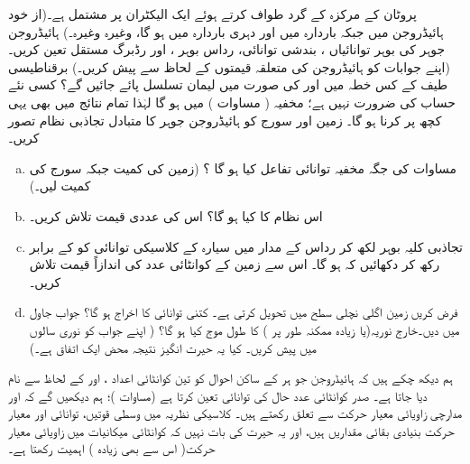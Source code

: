   پروٹان کے مرکزہ کے گرد طواف کرتے ہوئے ایک الیکٹران پر مشتمل ہے۔(از خود ہائیڈروجن میں  جبکہ باردارہ میں  اور دہری باردارہ  میں  ہو گا، وغیرہ وغیرہ۔) ہائیڈروجن جوہر کی بوہر توانائیاں ، بندشی توانائی، رداس بوہر ، اور رڈبرگ مستقل 
 تعین کریں۔ (اپنے جوابات کو ہائیڈروجن کی متعلقہ قیمتوں کے لحاظ سے پیش کریں۔) برقناطیسی طیف کے کس خطہ میں  اور  کی صورت میں لیمان تسلسل پائے جائیں گے؟  کسی نئے حساب کی ضرورت نہیں ہے؛ مخفیہ ( مساوات ) میں  ہو گا لہٰذا تمام نتائج میں بھی یہی کچھ پر کرنا ہو گا۔
زمین اور سورج کو ہائیڈروجن جوہر کا متبادل تجاذبی نظام تصور کریں۔
\begin{enumerate}[a.]
\item
 مساوات  کی جگہ مخفیہ توانائی تفاعل کیا ہو گا ؟ (زمین کی کمیت  جبکہ سورج کی کمیت  لیں۔)
\item
اس نظام کا   کیا ہو گا؟ اس کی عددی قیمت تلاش کریں۔
\item
تجاذبی کلیہ بوہر لکھ کر رداس  کے مدار میں سیارہ کے کلاسیکی توانائی کو  کے برابر رکھ کر دکھائیں کہ  ہو گا۔ اس سے زمین کے کوانٹائی عدد کی اندازاً قیمت تلاش کریں۔ 
\item
فرض کریں زمین اگلی نچلی سطح  میں تحویل کرتی ہے۔ کتنی توانائی کا اخراج ہو گا؟ جواب جاول میں دیں۔خارج نوریہ(یا زیادہ ممکنہ طور پر ) کا طول موج کیا ہو گا؟ ( اپنے جواب کو نوری سالوں میں پیش کریں۔ کیا یہ حیرت انگیز نتیجہ محض ایک اتفاق ہے۔)
\end{enumerate}

ہم دیکھ چکے ہیں کہ ہائیڈروجن جو ہر کے ساکن احوال کو تین کوانٹائی اعداد ،  اور  کے لحاظ سے نام دیا جاتا ہے۔ صدر کوانٹائی عدد  حال کی توانائی تعین کرتا ہے (مساوات )؛ ہم دیکھیں گے کہ  اور  مدارچی زاویائی معیار حرکت سے تعلق رکھتے ہیں۔ کلاسیکی نظریہ میں وسطی قوتیں، توانائی اور معیار حرکت بنیادی بقائی مقداریں ہیں، اور یہ حیرت کی بات نہیں کہ کوانٹائی میکانیات میں زاویائی معیار حرکت( اس سے بھی زیادہ ) اہمیت رکھتا ہے۔


